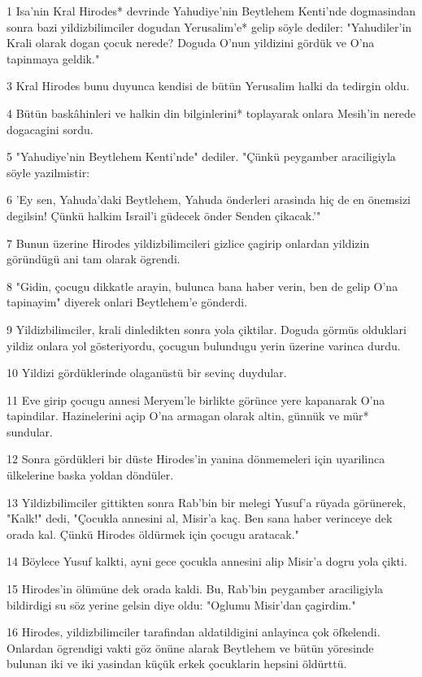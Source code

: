\par 1 Isa'nin Kral Hirodes* devrinde Yahudiye'nin Beytlehem Kenti'nde dogmasindan sonra bazi yildizbilimciler dogudan Yerusalim'e* gelip söyle dediler: "Yahudiler'in Krali olarak dogan çocuk nerede? Doguda O'nun yildizini gördük ve O'na tapinmaya geldik."
\par 3 Kral Hirodes bunu duyunca kendisi de bütün Yerusalim halki da tedirgin oldu.
\par 4 Bütün baskâhinleri ve halkin din bilginlerini* toplayarak onlara Mesih'in nerede dogacagini sordu.
\par 5 "Yahudiye'nin Beytlehem Kenti'nde" dediler. "Çünkü peygamber araciligiyla söyle yazilmistir:
\par 6 'Ey sen, Yahuda'daki Beytlehem, Yahuda önderleri arasinda hiç de en önemsizi degilsin! Çünkü halkim Israil'i güdecek önder Senden çikacak.'"
\par 7 Bunun üzerine Hirodes yildizbilimcileri gizlice çagirip onlardan yildizin göründügü ani tam olarak ögrendi.
\par 8 "Gidin, çocugu dikkatle arayin, bulunca bana haber verin, ben de gelip O'na tapinayim" diyerek onlari Beytlehem'e gönderdi.
\par 9 Yildizbilimciler, krali dinledikten sonra yola çiktilar. Doguda görmüs olduklari yildiz onlara yol gösteriyordu, çocugun bulundugu yerin üzerine varinca durdu.
\par 10 Yildizi gördüklerinde olaganüstü bir sevinç duydular.
\par 11 Eve girip çocugu annesi Meryem'le birlikte görünce yere kapanarak O'na tapindilar. Hazinelerini açip O'na armagan olarak altin, günnük ve mür* sundular.
\par 12 Sonra gördükleri bir düste Hirodes'in yanina dönmemeleri için uyarilinca ülkelerine baska yoldan döndüler.
\par 13 Yildizbilimciler gittikten sonra Rab'bin bir melegi Yusuf'a rüyada görünerek, "Kalk!" dedi, "Çocukla annesini al, Misir'a kaç. Ben sana haber verinceye dek orada kal. Çünkü Hirodes öldürmek için çocugu aratacak."
\par 14 Böylece Yusuf kalkti, ayni gece çocukla annesini alip Misir'a dogru yola çikti.
\par 15 Hirodes'in ölümüne dek orada kaldi. Bu, Rab'bin peygamber araciligiyla bildirdigi su söz yerine gelsin diye oldu: "Oglumu Misir'dan çagirdim."
\par 16 Hirodes, yildizbilimciler tarafindan aldatildigini anlayinca çok öfkelendi. Onlardan ögrendigi vakti göz önüne alarak Beytlehem ve bütün yöresinde bulunan iki ve iki yasindan küçük erkek çocuklarin hepsini öldürttü.
